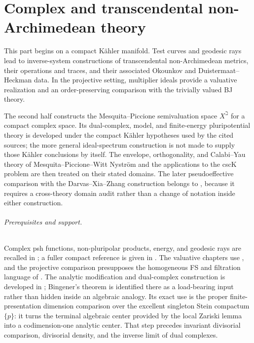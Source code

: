 \part{Complex and transcendental non-Archimedean theory}
\label{part:complex}

This part begins on a compact K\"ahler manifold.  Test curves and geodesic
rays lead to inverse-system constructions of transcendental
non-Archimedean metrics, their operations and traces, and their associated
Okounkov and Duistermaat--Heckman data.  In the projective setting,
multiplier ideals provide a valuative realization and an order-preserving
comparison with the trivially valued BJ theory.

The second half constructs the Mesquita--Piccione semivaluation space
\(X^\beth\) for a compact complex space.  Its dual-complex, model, and
finite-energy pluripotential theory is developed under the compact K\"ahler
hypotheses used by the cited sources; the more general ideal-spectrum
construction is not made to supply those K\"ahler conclusions by itself.
The envelope, orthogonality, and Calabi--Yau theory of
Mesquita--Piccione--Witt Nystr\"om and the applications to the cscK problem
are then treated on their stated domains.  The later
pseudoeffective comparison with the Darvas--Xia--Zhang construction belongs
to , because it requires a cross-theory domain audit
rather than a change of notation inside either construction.

\paragraph{Prerequisites and support.}
\label{front:part5-prerequisites-and-support}
Complex psh functions, non-pluripolar products, energy, and geodesic rays are
recalled in ; a fuller compact reference is
given in .  The valuative chapters use
, and the projective
comparison presupposes the homogeneous FS and filtration language of
.  The analytic
modification and dual-complex construction is developed in
; Bingener's theorem is identified there as a
load-bearing input rather than hidden inside an algebraic analogy.  Its exact
use is the proper finite-presentation dimension comparison over the excellent
singleton Stein compactum \(\{p\}\): it turns the terminal algebraic center
provided by the local Zariski lemma into a codimension-one analytic center.
That step precedes invariant divisorial comparison, divisorial density, and
the inverse limit of dual complexes.

